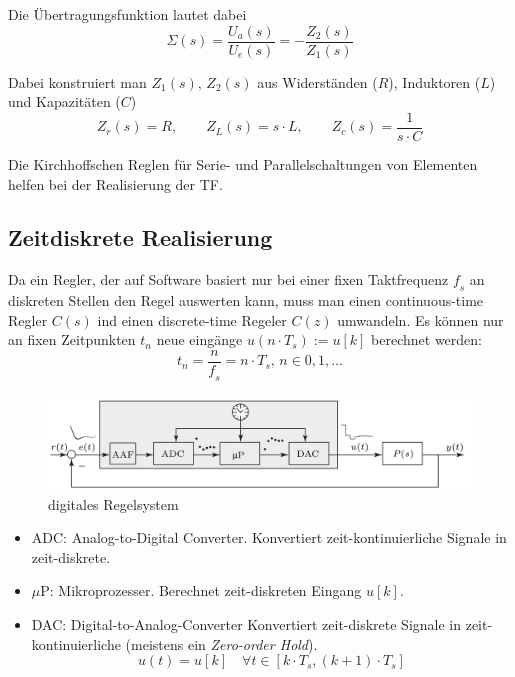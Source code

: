     Die Übertragungsfunktion lautet dabei
    \begin{equation*}
        \Sigma(s) = \frac{U_a(s)}{U_e(s)} = -\frac{Z_2(s)}{Z_1(s)}
    \end{equation*}
    
    Dabei konstruiert man $Z_1(s),\, Z_2(s)$ aus Widerständen ($R$), Induktoren ($L$) und Kapazitäten ($C$)
    \begin{equation*}
        Z_r(s) = R, \qquad Z_L(s) = s\cdot L, \qquad Z_c(s) = \frac{1}{s\cdot C}
    \end{equation*}
    
    Die Kirchhoffschen Reglen für Serie- und Parallelschaltungen von Elementen helfen bei der Realisierung der TF.
    
\subsection{Zeitdiskrete Realisierung}
    Da ein Regler, der auf Software basiert nur bei einer fixen Taktfrequenz $\mathit{f}_s$ an diskreten Stellen den Regel auswerten kann, muss man einen continuous-time Regler $C(s)$ ind einen discrete-time Regeler $C(z)$ umwandeln. Es können nur an fixen Zeitpunkten $t_n$ neue eingänge $u(n\cdot T_s):=u[k]$ berechnet werden:
    \begin{equation*}
        t_n = \frac{n}{\mathit{f}_s} = n\cdot T_s,\, n\in0,1,\dots
    \end{equation*}
    
    \begin{figure}[H]
        \centering
        \includegraphics[width = 0.6\linewidth]{images/04/disc_time.jpeg}
        \caption{digitales Regelsystem}
    \end{figure}
    \begin{itemize}
        \item ADC: Analog-to-Digital Converter. Konvertiert zeit-kontinuierliche Signale in zeit-diskrete.
        
        \item $\mu$P: Mikroprozesser. Berechnet zeit-diskreten Eingang $u[k]$.
        
        \item DAC: Digital-to-Analog-Converter Konvertiert zeit-diskrete Signale in zeit-kontinuierliche (meistens ein \textit{Zero-order Hold}).
        \begin{equation*}
            u(t) = u[k] \quad \forall t\in [k\cdot T_s,(k+1)\cdot T_s]
        \end{equation*}
    \end{itemize}
    
